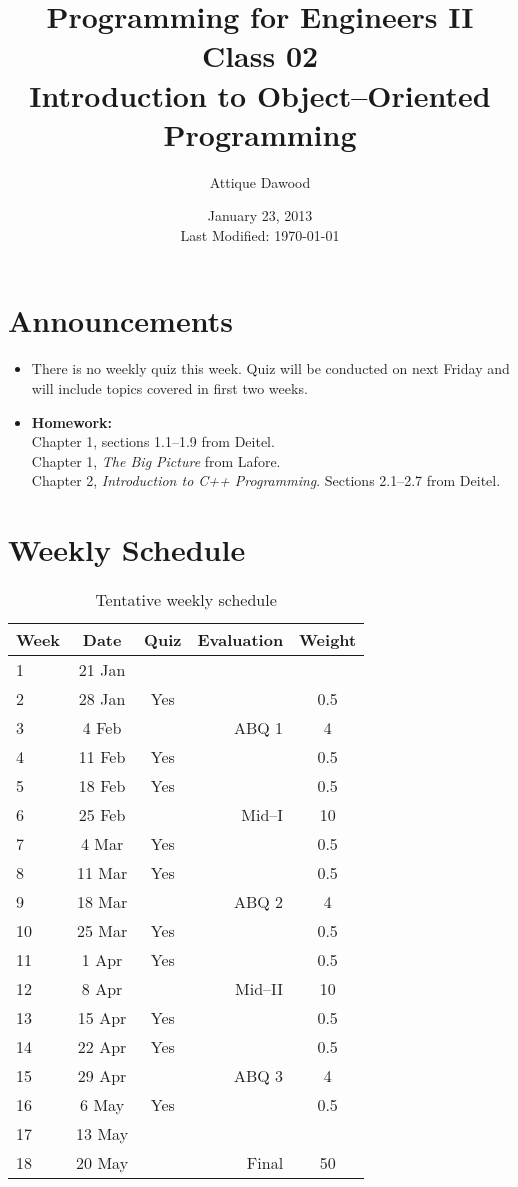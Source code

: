 \documentclass[12pt,a4paper]{article}
\title{\vspace{-2cm}Programming for Engineers II\\Class 02\\Introduction to Object--Oriented Programming}
\author{Attique Dawood}
\date{January 23, 2013\\[0.2cm] Last Modified: \today}
\begin{document}
\maketitle
\section{Announcements}
\begin{itemize}
\item There is no weekly quiz this week. Quiz will be conducted on next Friday and will include topics covered in first two weeks.
\item \textbf{Homework:}\\
Chapter 1, sections 1.1--1.9 from Deitel.\\
Chapter 1, \textit{The Big Picture} from Lafore.\\
Chapter 2, \textit{Introduction to C++ Programming}. Sections 2.1--2.7 from Deitel.
\end{itemize}
\section{Weekly Schedule}
\begin{table}[H]
\begin{center}
\vspace{-0.3cm}
	\begin{tabular}{lccrc}
	\hline \hline
		\rule{0pt}{2.6ex} \textbf{Week} & \textbf{Date} & \textbf{Quiz} & \textbf{Evaluation} & \textbf{Weight}\\
		\hline
		1 \rule{0pt}{2.6ex} & 21 Jan & & & \\
		2 & 28 Jan & Yes & & 0.5 \\
		3 & 4 Feb & & ABQ 1 & 4 \\
		4 & 11 Feb & Yes & & 0.5 \\
		5 & 18 Feb & Yes & & 0.5 \\
		6 & 25 Feb & & Mid--I & 10 \\
		7 & 4 Mar & Yes & & 0.5 \\
		8 & 11 Mar & Yes & & 0.5 \\
		9 & 18 Mar & & ABQ 2& 4 \\
		10 & 25 Mar & Yes & & 0.5 \\
		11 & 1 Apr & Yes & & 0.5 \\
		12 & 8 Apr & & Mid--II& 10 \\
		13 & 15 Apr & Yes & & 0.5 \\
		14 & 22 Apr & Yes & & 0.5 \\
		15 & 29 Apr & & ABQ 3& 4 \\
		16 & 6 May & Yes & & 0.5 \\
		17 & 13 May & & & \\
		18 & 20 May & & Final & 50 \\
	\hline \hline
	\end{tabular}
\end{center}
\label{Tentative-Weekly-Schedule}
\caption{Tentative weekly schedule}
\end{table}
\end{document}
